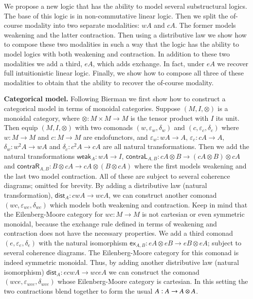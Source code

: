 \documentclass{article}
\let\mto\to
\let\to\relax
\newcommand{\to}{\rightarrow}
\let\c\relax
\newcommand{\w}[1]{\mathsf{weak}_{#1}}
\newcommand{\c}[1]{\mathsf{contra}_{#1}}
\newcommand{\cL}[1]{\mathsf{contraL}_{#1}}
\newcommand{\cR}[1]{\mathsf{contraR}_{#1}}
\newcommand{\e}[1]{\mathsf{ex}_{#1}}
\begin{document}
We propose a new logic that has the ability to model several
substructural logics.  The base of this logic is in non-commutative
linear logic.  Then we split the of-course modality into two separate
modalities: $w A$ and $c A$.  The former models weakening and the
latter contraction.  Then using a distributive law we show how to
compose these two modalities in such a way that the logic has the
ability to model logics with both weakening and contraction.  In
addition to these two modalities we add a third, $e A$, which adds
exchange.  In fact, under $e A$ we recover full intuitionistic linear
logic.  Finally, we show how to compose all three of these modalities
to obtain that the ability to recover the of-course modality.

\textbf{Categorical model.} Following Bierman \cite{Bierman:1994} we
first show how to construct a categorical model in terms of monoidal
categories.  Suppose $(M, I, \otimes)$ is a monoidal category, where
$\otimes : M \times M \mto M$ is the tensor product with $I$ its unit.
Then equip $(M, I, \otimes)$ with two comonads
$(w,\varepsilon_w,\delta_w)$ and $(c,\varepsilon_c,\delta_c)$ where $w
: M \mto M$ and $c : M \mto M$ are endofunctors, and $\varepsilon_w :
wA \mto A$, $\varepsilon_c : cA \mto A$, $\delta_w : w^2A \mto wA$ and
$\delta_c : c^2A \mto cA$ are all natural transformations.  Then we
add the natural transformations $\w{A} : wA \mto I$, $\cL{A,B} : cA
\otimes B \mto (cA \otimes B) \otimes cA$ and $\cR{A,B} : B \otimes cA
\mto cA \otimes (B \otimes cA)$ where the first models weakening and
the last two model contraction.  All of these are subject to several
coherence diagrams; omitted for brevity.  By adding a distributive law
(natural transformation), $\mathsf{dist}_A : cwA \mto wcA$, we can
construct another comonad $(wc,\varepsilon_{wc},\delta_{wc})$ which
models both weakening and contraction.  Keep in mind that the
Eilenberg-Moore category for $wc : M \mto M$ is not cartesian or even
symmetric monoidal, because the exchange rule defined in terms of
weakening and contraction does not have the necessary properties.  We
add a third comonad $(e,\varepsilon_e,\delta_e)$ with the natural
isomorphism $\e{A,B} : eA \otimes eB \mto eB \otimes eA$; subject
to several coherence diagrams.  The Eilenberg-Moore category for this
comonad is indeed symmetric monoidal.  Thus, by adding another
distributive law (natural isomorphism) $\mathsf{dist}_A : ecwA \mto
wceA$ we can construct the comonad
$(wce,\varepsilon_{wce},\delta_{wce})$ whose Eilenberg-Moore category
is cartesian.  In this setting the two contractions blend together to
form the usual $\c{A} : A \mto A \otimes A$.
\end{document}
